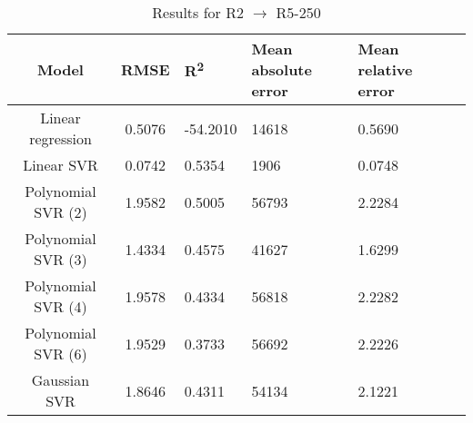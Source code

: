 \begin{table}[H]
\centering
\begin{adjustbox}{center}
\begin{tabular}{c | c M{1.2cm} M{2.5cm} M{2.5cm} M{1.8cm}}
Model & RMSE & R\textsuperscript{2} & Mean absolute error & Mean relative error \tabularnewline
\hline
Linear regression & 0.5076 & -54.2010 &  14618 & 0.5690 \\
Linear SVR & 0.0742 & 0.5354 &   1906 & 0.0748 \\
Polynomial SVR (2) & 1.9582 & 0.5005 &  56793 & 2.2284 \\
Polynomial SVR (3) & 1.4334 & 0.4575 &  41627 & 1.6299 \\
Polynomial SVR (4) & 1.9578 & 0.4334 &  56818 & 2.2282 \\
Polynomial SVR (6) & 1.9529 & 0.3733 &  56692 & 2.2226 \\
Gaussian SVR & 1.8646 & 0.4311 &  54134 & 2.1221 \\
\end{tabular}
\end{adjustbox}
\\
\caption{Results for R2 $\rightarrow$ R5-250}
\label{tab:coreonly_linear_R2_R5_250}
\end{table}
